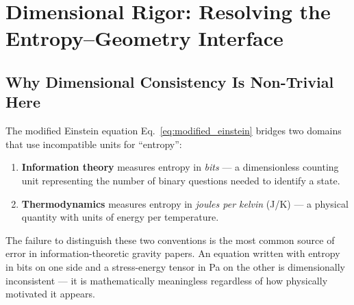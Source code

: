 %

\section{Dimensional Rigor: Resolving the Entropy--Geometry Interface}
\label{sec:dimensional_rigor}

\subsection{Why Dimensional Consistency Is Non-Trivial Here}
\label{subsec:why_nontrivial}

The modified Einstein equation Eq.~\eqref{eq:modified_einstein} bridges
two domains that use incompatible units for ``entropy'':

\begin{enumerate}
    \item \textbf{Information theory} measures entropy in \emph{bits} ---
    a dimensionless counting unit representing the number of binary
    questions needed to identify a state.

    \item \textbf{Thermodynamics} measures entropy in
    \emph{joules per kelvin} (J/K) --- a physical quantity with units
    of energy per temperature.
\end{enumerate}

\noindent The failure to distinguish these two conventions is the most
common source of error in information-theoretic gravity papers. An
equation written with entropy in bits on one side and a stress-energy
tensor in Pa on the other is dimensionally inconsistent --- it is
mathematically meaningless regardless of how physically motivated it
appears.

